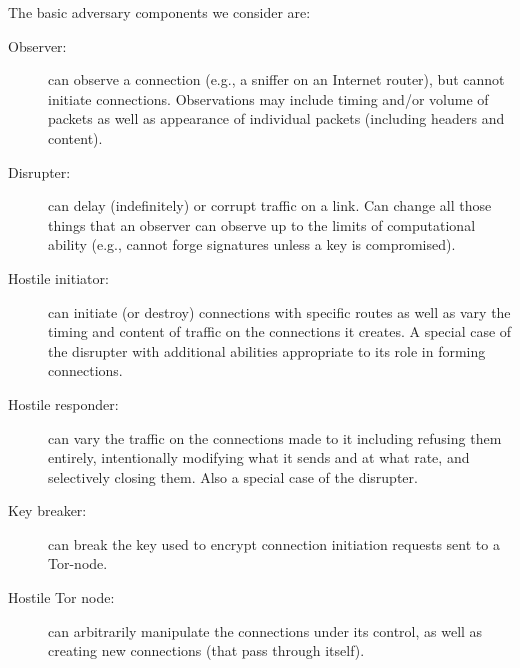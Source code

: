 \documentclass[times,10pt,twocolumn]{article}
\begin{document}
The basic adversary components we consider are:
\begin{description}
\item[Observer:] can observe a connection (e.g., a sniffer on an
  Internet router), but cannot initiate connections. Observations may
  include timing and/or volume of packets as well as appearance of
  individual packets (including headers and content).
\item[Disrupter:] can delay (indefinitely) or corrupt traffic on a
  link. Can change all those things that an observer can observe up to
  the limits of computational ability (e.g., cannot forge signatures
  unless a key is compromised).
\item[Hostile initiator:] can initiate (or destroy) connections with
  specific routes as well as vary the timing and content of traffic
  on the connections it creates. A special case of the disrupter with
  additional abilities appropriate to its role in forming connections.
\item[Hostile responder:] can vary the traffic on the connections made
  to it including refusing them entirely, intentionally modifying what
  it sends and at what rate, and selectively closing them. Also a
  special case of the disrupter.
\item[Key breaker:] can break the key used to encrypt connection
  initiation requests sent to a Tor-node.
%


\item[Hostile Tor node:] can arbitrarily manipulate the
  connections under its control, as well as creating new connections
  (that pass through itself).
\end{description}
\end{document}
